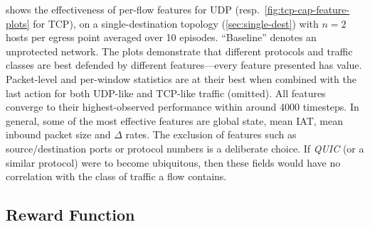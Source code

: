 \documentclass[10pt, times, conference, letterpaper]{IEEEtran}
\begin{document}

 shows the effectiveness of per-flow features for UDP (resp.\ \cref{fig:tcp-cap-feature-plots} for TCP), on a single-destination topology (\cref{sec:single-dest}) with $n=2$ hosts per egress point averaged over 10 episodes.
``Baseline'' denotes an unprotected network.
The plots demonstrate that different protocols and traffic classes are best defended by different features---every feature presented has value.
Packet-level and per-window statistics are at their best when combined with the last action for both UDP-like and TCP-like traffic (omitted).
All features converge to their highest-observed performance within around \num{4000} timesteps.
In general, some of the most effective features are global state, mean IAT, mean inbound packet size and $\Delta$ rates.
The exclusion of features such as source/destination ports or protocol numbers is a deliberate choice.
If \emph{QUIC} (or a similar protocol) were to become ubiquitous, then these fields would have no correlation with the class of traffic a flow contains.

\subsection{Reward Function}

%
\end{document}
